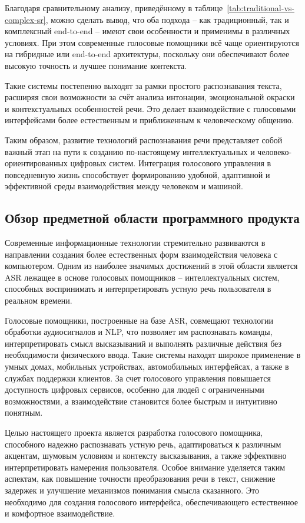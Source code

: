 Благодаря сравнительному анализу, приведённому в таблице~\ref{tab:traditional-vs-complex-sr}, можно сделать вывод, что оба подхода -- как традиционный, так и комплексный end-to-end -- имеют свои особенности и применимы в различных условиях. При этом современные голосовые помощники всё чаще ориентируются на гибридные или end-to-end архитектуры, поскольку они обеспечивают более высокую точность и лучшее понимание контекста.

Такие системы постепенно выходят за рамки простого распознавания текста, расширяя свои возможности за счёт анализа интонации, эмоциональной окраски и контекстуальных особенностей речи. Это делает взаимодействие с голосовыми интерфейсами более естественным и приближенным к человеческому общению.

Таким образом, развитие технологий распознавания речи представляет собой важный этап на пути к созданию по-настоящему интеллектуальных и человеко-ориентированных цифровых систем. Интеграция голосового управления в повседневную жизнь способствует формированию удобной, адаптивной и эффективной среды взаимодействия между человеком и машиной.

\subsection{Обзор предметной области программного продукта}

Современные информационные технологии стремительно развиваются в направлении создания более естественных форм взаимодействия человека с компьютером. Одним из наиболее значимых достижений в этой области является ASR лежащее в основе голосовых помощников -- интеллектуальных систем, способных воспринимать и интерпретировать устную речь пользователя в реальном времени.

Голосовые помощники, построенные на базе ASR, совмещают технологии обработки аудиосигналов и NLP, что позволяет им распознавать команды, интерпретировать смысл высказываний и выполнять различные действия без необходимости физического ввода. Такие системы находят широкое применение в умных домах, мобильных устройствах, автомобильных интерфейсах, а также в службах поддержки клиентов. За счет голосового управления повышается доступность цифровых сервисов, особенно для людей с ограниченными возможностями, а взаимодействие становится более быстрым и интуитивно понятным.

Целью настоящего проекта является разработка голосового помощника, способного надежно распознавать устную речь, адаптироваться к различным акцентам, шумовым условиям и контексту высказывания, а также эффективно интерпретировать намерения пользователя. Особое внимание уделяется таким аспектам, как повышение точности преобразования речи в текст, снижение задержек и улучшение механизмов понимания смысла сказанного. Это необходимо для создания голосового интерфейса, обеспечивающего естественное и комфортное взаимодействие.

